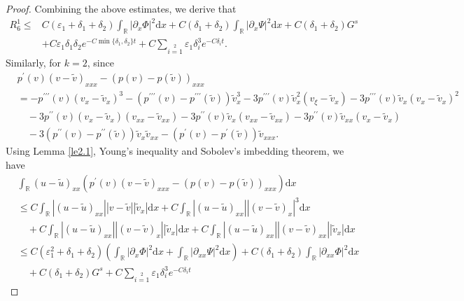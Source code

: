 \documentclass[10pt,reqno]{amsart}
\numberwithin{equation}{section}
\newcommand{\dif}{\mathrm{d}}
\begin{document}
\begin{proof}
Combining the above estimates, we derive that
\begin{align*}
R_6^1\le &C(\varepsilon_1+\delta_1+\delta_2)\int_\mathbb{R}|\partial_{x}\Phi|^2\dif x
  +C(\delta_1+\delta_2)\int_\mathbb{R}|\partial_{x}\Psi|^2\dif x
  +C(\delta_1+\delta_2)G^s\\
  &+C\varepsilon_1\delta_1\delta_2e^{-C\min\{\delta_1,\delta_2\}t}+C\sum\limits_{i=1}\limits^2\varepsilon_1 \delta_i^3e^{-C\delta_i t}.
\end{align*}
Similarly, for $k=2$, since
\begin{align*}
  &p^{\prime}(v)(v-\widetilde{v})_{xxx}-(p(v)-p(\widetilde{v}))_{xxx}\\
   &=-p^{\prime\prime\prime}(v)(v_{x}-\widetilde{v}_{x})^3
   -(p^{\prime\prime\prime}(v)-p^{\prime\prime\prime}(\widetilde{v}))\widetilde{v}_{x}^3
   -3p^{\prime\prime\prime}(v)\widetilde{v}_{x}^2(v_{\xi}-\widetilde{v}_{x})
   -3p^{\prime\prime\prime}(v)\widetilde{v}_{x}(v_{x}-\widetilde{v}_{x})^2\\
   &\quad-3p^{\prime\prime}(v)(v_{x}-\widetilde{v}_{x})(v_{xx}
   -\widetilde{v}_{xx})-3p^{\prime\prime}(v)\widetilde{v}_{x}(v_{xx}-\widetilde{v}_{xx})
  -3p^{\prime\prime}(v)\widetilde{v}_{xx}(v_{x}-\widetilde{v}_{x})\\
   &\quad-3(p^{\prime\prime}(v)-p^{\prime\prime}(\widetilde{v}))\widetilde{v}_{x}\widetilde{v}_{xx}
   -(p^{\prime}(v)-p^{\prime}(\widetilde{v}))\widetilde{v}_{xxx}.
\end{align*}
Using Lemma \ref{le2.1}, Young's inequality and Sobolev's imbedding theorem, we have
\begin{align*}
 &\int_\mathbb{R}(u-\widetilde{u})_{xx}
     (p^{\prime}(v)(v-\widetilde{v})_{xxx}-(p(v)-p(\widetilde{v}))_{xxx})\dif x\\
      &\leq C\int_\mathbb{R}|(u-\widetilde{u})_{xx}||v-\widetilde{v}||\widetilde{v}_x|\dif x
      +C\int_\mathbb{R}|(u-\widetilde{u})_{xx}||(v-\widetilde{v})_{x}|^3\dif x\\
     &\quad +C\int_\mathbb{R}|(u-\widetilde{u})_{xx}||(v-\widetilde{v})_x||\widetilde{v}_x|\dif x
      +C\int_\mathbb{R}|(u-\widetilde{u})_{xx}||(v-\widetilde{v})_{xx}||\widetilde{v}_x|\dif x\\
& \le C(\varepsilon_1^2+\delta_1+\delta_2)\left(\int_\mathbb{R}|\partial_{x}\Phi|^2\dif x
+\int_\mathbb{R}|\partial_{xx}\Psi|^2\dif x\right)
  +C(\delta_1+\delta_2)\int_\mathbb{R}|\partial_{xx}\Phi|^2\dif x\\
 &\quad +C(\delta_1+\delta_2)G^s+C\sum\limits_{i=1}\limits^2\varepsilon_1 \delta_i^3e^{-C\delta_i t}

\end{align*}
\end{proof}
\end{document}
